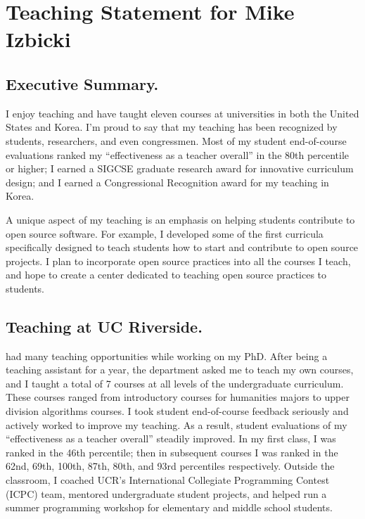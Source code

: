 \documentclass[12pt]{article}
\begin{document}
\section*{Teaching Statement for Mike Izbicki}

\subsection*{Executive Summary.}
I enjoy teaching and have taught eleven courses at universities in both the United States and Korea.
I'm proud to say that my teaching has been recognized by students, researchers, and even congressmen.
Most of my student end-of-course evaluations ranked my ``effectiveness as a teacher overall'' in the 80th percentile or higher;
I earned a SIGCSE graduate research award for innovative curriculum design;
and I earned a Congressional Recognition award for my teaching in Korea.

A unique aspect of my teaching is an emphasis on helping students contribute to open source software.
For example, I developed some of the first curricula specifically designed to teach students how to start and contribute to open source projects.
I plan to incorporate open source practices into all the courses I teach,
and hope to create a center dedicated to teaching open source practices to students.


\vspace{-0.15in}
\subsection*{Teaching at UC Riverside.}
 had many teaching opportunities while working on my PhD.
After being a teaching assistant for a year, 
the department asked me to teach my own courses,
and I taught a total of 7 courses at all levels of the undergraduate curriculum.
These courses ranged from introductory courses for humanities majors to upper division algorithms courses.
I took student end-of-course feedback seriously and actively worked to improve my teaching.
As a result, student evaluations of my ``effectiveness as a teacher overall'' steadily improved.
In my first class, I was ranked in the 46th percentile; 
then in subsequent courses I was ranked in the 62nd, 69th, 100th, 87th, 80th, and 93rd percentiles respectively.
Outside the classroom,
I coached UCR's International Collegiate Programming Contest (ICPC) team,
mentored undergraduate student projects,
and helped run a summer programming workshop for elementary and middle school students.
\end{document}

